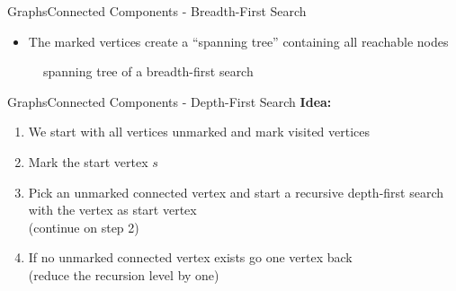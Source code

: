 
\begin{frame}{Graphs}{Connected Components - Breadth-First Search}
  \begin{itemize}
    \item<2->
      The marked vertices create a \enquote{spanning tree} containing all
      reachable nodes
  \end{itemize}
  \begin{figure}
    \begin{adjustbox}{width=0.95\linewidth}
      
    \end{adjustbox}
    \caption{spanning tree of a breadth-first search}
    \label{fig:graph:breadth_first_search_spanning_tree}
  \end{figure}
\end{frame}


\begin{frame}{Graphs}{Connected Components - Depth-First Search}
  \textbf{Idea:}
  \begin{enumerate}
    \item<2->
      We start with all vertices unmarked and
      {\color{Mittel-Blau}mark visited vertices}
    \item<3->
      Mark the start vertex {\color{Mittel-Blau}$s$}
    \item<4->
      Pick an unmarked {\color{Mittel-Blau}connected vertex} and start a
      {\color{Mittel-Blau}recursive depth-first search} with the vertex as
      start vertex\\
      (continue on step 2)
    \item<5->
      If no unmarked connected vertex exists go one vertex back\\
      (reduce the recursion level by one)
  \end{enumerate}
\end{frame}


